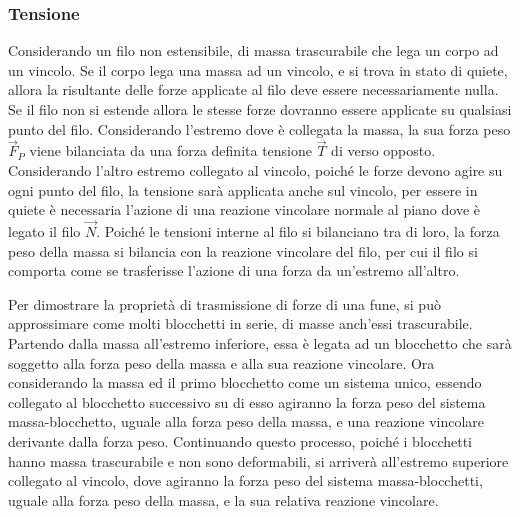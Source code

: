 \documentclass{article}
\numberwithin{equation}{subsection}
\begin{document}
\subsubsection{Tensione}
Considerando un filo non estensibile, di massa trascurabile che 
lega un corpo ad un vincolo. Se il corpo lega una massa ad un vincolo, e si trova in stato di quiete, allora la risultante delle forze applicate al filo deve essere 
necessariamente nulla. Se il filo non si estende allora le stesse forze dovranno essere applicate su qualsiasi punto del filo. Considerando l'estremo dove è collegata 
la massa, la sua forza peso $\vec{F}_P$ viene bilanciata da una forza definita tensione $\vec{T}$ di verso opposto. Considerando l'altro estremo collegato al vincolo, poiché 
le forze devono agire su ogni punto del filo, la tensione sarà applicata anche sul vincolo, per essere in quiete è necessaria l'azione di una reazione vincolare normale al piano 
dove è legato il filo $\vec{N}$. Poiché le tensioni interne al filo si bilanciano tra di loro, la forza peso della massa si bilancia con la reazione vincolare del filo, per cui 
il filo si comporta come se trasferisse l'azione di una forza da un'estremo all'altro. 

\begin{center}\end{center}

Per dimostrare la proprietà di trasmissione di forze di una fune, si può approssimare 
come molti blocchetti in serie, di masse anch'essi trascurabile. 
Partendo dalla massa all'estremo inferiore, essa è legata ad un 
blocchetto che sarà soggetto alla forza peso della massa e alla 
sua reazione vincolare. Ora considerando la massa ed il primo 
blocchetto come un sistema unico, essendo collegato al blocchetto 
successivo su di esso agiranno la forza peso del sistema massa-blocchetto, uguale alla forza peso della massa, e una reazione 
vincolare derivante dalla forza peso. Continuando questo processo, 
poiché i blocchetti hanno massa trascurabile e non sono deformabili, 
si arriverà all'estremo superiore collegato al vincolo, dove agiranno 
la forza peso del sistema massa-blocchetti, uguale alla forza peso 
della massa, e la sua relativa reazione vincolare.
\end{document}
